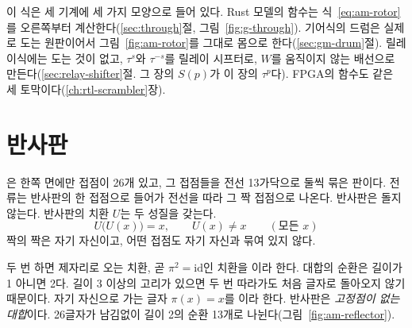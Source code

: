 \Ours 이 식은 세 기계에 세 가지 모양으로 들어 있다. Rust 모델의  함수는 식~\eqref{eq:am-rotor}를
오른쪽부터 계산한다(\ref{sec:through}절, 그림~\ref{fig:g-through}). 기어식의 드럼은 실제로 도는 원판이어서
그림~\ref{fig:am-rotor}를 그대로 몸으로 한다(\ref{sec:gm-drum}절). 릴레이식에는 도는 것이 없고, $\tau^{s}$와
$\tau^{-s}$를 릴레이 시프터로, $W$를 움직이지 않는 배선으로 만든다(\ref{sec:relay-shifter}절. 그 장의 $S(p)$가 이
장의 $\tau^{p}$다). FPGA의  함수도 같은 세 토막이다(\ref{ch:rtl-scrambler}장).

\section{반사판}\label{sec:am-reflector}

은 한쪽 면에만 접점이 26개 있고, 그 접점들을 전선 13가닥으로 둘씩 묶은 판이다. 전류는
반사판의 한 접점으로 들어가 전선을 따라 그 짝 접점으로 나온다. 반사판은 돌지 않는다. 반사판의 치환 $U$는 두
성질을 갖는다.
\begin{equation}
  U\bigl(U(x)\bigr) = x, \qquad U(x) \neq x \qquad (\text{모든 } x) \label{eq:am-reflector}
\end{equation}
짝의 짝은 자기 자신이고, 어떤 접점도 자기 자신과 묶여 있지 않다.

두 번 하면 제자리로 오는 치환, 곧 $\pi^2 = \mathrm{id}$인 치환을 이라 한다. 대합의 순환은
길이가 1 아니면 2다. 길이 3 이상의 고리가 있으면 두 번 따라가도 처음 글자로 돌아오지 않기 때문이다. 자기
자신으로 가는 글자 $\pi(x) = x$를 이라 한다. 반사판은 \emph{고정점이 없는 대합}이다.
26글자가 남김없이 길이 2의 순환 13개로 나뉜다(그림~\ref{fig:am-reflector}).

